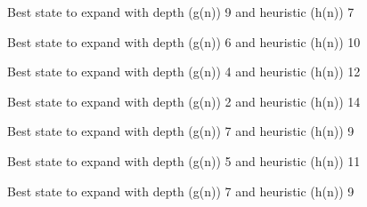 \documentclass{article}
\begin{document}
{\noindent Best state to expand with depth (g(n)) 9 and heuristic (h(n)) 7\newline}
{}\newline

{\noindent Best state to expand with depth (g(n)) 6 and heuristic (h(n)) 10\newline}
{}\newline

{\noindent Best state to expand with depth (g(n)) 4 and heuristic (h(n)) 12\newline}
{}\newline

{\noindent Best state to expand with depth (g(n)) 2 and heuristic (h(n)) 14\newline}
{}\newline

{\noindent Best state to expand with depth (g(n)) 7 and heuristic (h(n)) 9\newline}
{}\newline

{\noindent Best state to expand with depth (g(n)) 5 and heuristic (h(n)) 11\newline}
{}\newline

{\noindent Best state to expand with depth (g(n)) 7 and heuristic (h(n)) 9\newline}
{}\newline
\end{document}
